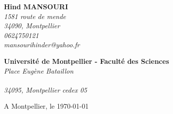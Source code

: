 \documentclass[11pt]{letter}
\begin{document}
 \sffamily
 \hfill
 \begin{flushleft}
 {\bfseries Hind MANSOURI}\\[.35ex]
 \small\itshape
    1581 route de mende  \\
 34090, Montpellier \\[.35ex]
 0624750121\\
 mansourihinder@yahoo.fr
 \end{flushleft}
 \begin{flushright}
 {\bfseries Université de Montpellier - Faculté des Sciences}\\[.35ex]
 \small\itshape
 Place Eugène Bataillon	
\\ \\
 34095, Montpellier cedex 05
 \end{flushright}
 \hfill
 \begin{flushright}
 A Montpellier, le \today \\
 
 \end{flushright}
\end{document}
